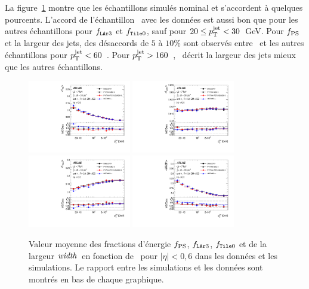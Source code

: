 La figure~\ref{fig:jetprop_vs_pT} montre que les échantillons simulés nominal et  s'accordent à quelques pourcents. L'accord de l'échantillon \herwig~avec les données est aussi bon que pour les autres échantillons pour $f_{\texttt{LAr} 3}$ et $f_{\texttt{Tile} 0}$, sauf pour $20 \le p_{\mathrm{T}}^\mathrm{jet} < 30$~GeV. Pour $f_{\rm PS}$ et la largeur des jets, des désaccords de $5$ à $10 \%$ sont observés entre \herwigpp~et les autres échantillons pour $p_{\mathrm{T}}^\mathrm{jet} < 60$~\GeV. Pour $p_{\mathrm{T}}^\mathrm{jet} > 160$~\GeV, \herwigpp~décrit la largeur des jets mieux que les autres échantillons.

\begin{figure}[ht!]
\centering
\includegraphics[width=0.4\textwidth]{figures/fig_50a.pdf}
\hspace{1.cm}
\includegraphics[width=0.4\textwidth]{figures/fig_50b.pdf}\\
\includegraphics[width=0.4\textwidth]{figures/fig_50d.pdf}
\hspace{1.cm}
\includegraphics[width=0.4\textwidth]{figures/fig_50c.pdf}
\caption{Valeur moyenne des fractions d'\'energie $f_{\rm PS}$,  $f_{\texttt{LAr} 3}$, $f_{\texttt{Tile} 0}$ et de la largeur ${\rm\it width}$~en fonction de \pt~pour $|\eta| < 0,6$ dans les donn\'ees et les simulations. Le rapport entre les simulations et les donn\'ees sont montr\'es en bas de chaque graphique.}
\label{fig:jetprop_vs_pT}
\end{figure}

